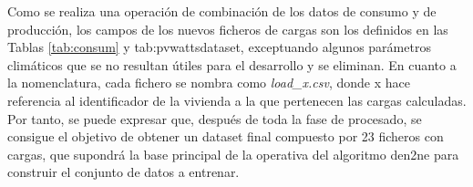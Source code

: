 \vspace{3mm}

Como se realiza una operación de combinación de los datos de consumo y de producción, los campos de los nuevos ficheros de cargas son los definidos en las Tablas \ref{tab:consum} y {tab:pvwattsdataset}, exceptuando algunos parámetros climáticos que se no resultan útiles para el desarrollo y se eliminan. En cuanto a la nomenclatura, cada fichero se nombra como \textit{load\_x.csv}, donde x hace referencia al identificador de la vivienda a la que pertenecen las cargas calculadas. Por tanto, se puede expresar que, después de toda la fase de procesado, se consigue el objetivo de obtener un dataset final compuesto por 23 ficheros con cargas, que supondrá la base principal de la operativa del algoritmo \gls{den2ne} para construir el conjunto de datos a entrenar.

